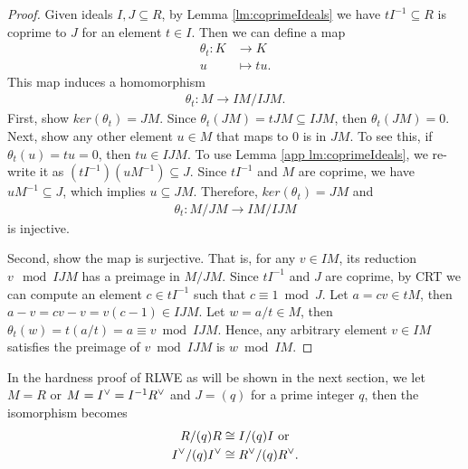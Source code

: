 \documentclass[../main.tex]{subfiles}
\begin{document}
\begin{proof}
Given ideals $I,J\subseteq R$, by Lemma \ref{lm:coprimeIdeals} we have $tI^{-1} \subseteq R$ is coprime to $J$ for an element $t \in I$. Then we can define a map 
\begin{align*}
    \theta_t: K &\rightarrow K \\
    u &\mapsto tu.
\end{align*}
This map induces a homomorphism 
\begin{align*}
    \theta_t: M \rightarrow IM/IJM.
\end{align*}
First, show $ker(\theta_t)=JM$. Since $\theta_t(JM)=tJM \subseteq IJM$, then $\theta_t(JM)=0$. Next, show any other element $u \in M$ that maps to 0 is in $JM$. To see this, if $\theta_t(u)=tu=0$, then $tu \in IJM$. To use Lemma \ref{app lm:coprimeIdeals}, we re-write it as $(tI^{-1}) (uM^{-1})\subseteq J$. Since $tI^{-1}$ and $M$ are coprime, we have $uM^{-1}\subseteq J$, which implies $u\subseteq JM$. Therefore, $ker(\theta_t)=JM$ and
\begin{align*}
    \theta_t: M/JM \rightarrow IM/IJM
\end{align*}
is injective. 

Second, show the map is surjective. That is, for any $v \in IM$, its reduction $v \mod IJM$ has a preimage in $M/JM$. Since $tI^{-1}$ and $J$ are coprime, by CRT we can compute an element $c \in tI^{-1}$ such that $c \equiv 1 \bmod J$. Let $a = cv \in tM$, then $a-v=cv-v=v(c-1) \in IJM$. Let $w=a/t \in M$, then $\theta_t(w)=t (a/t)=a \equiv v \bmod IJM$. Hence, any arbitrary element $v \in IM$ satisfies the preimage of $v \bmod IJM$ is $w \bmod IM$. 
\end{proof}

In the hardness proof of RLWE as will be shown in the next section, we let $M=R$ or $M=I^{\vee}=I^{-1}R^{\vee}$ and $J=(q)$ for a prime integer $q$, then the isomorphism becomes 
\begin{align*}
    R/(q)R &\cong I/(q)I \text{ or } \\
    I^{\vee} / (q)I^{\vee} &\cong R^{\vee} / (q)R^{\vee}.
\end{align*}
\fi

%
%
\end{document}
